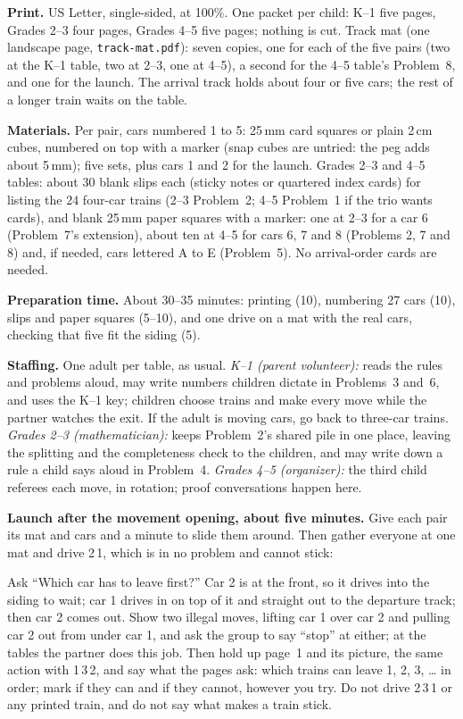 \documentclass[11pt]{article}
\newcommand{\yes}{\ding{51}}\newcommand{\no}{\ding{55}}
\newcommand{\tr}[1]{\mbox{#1}}
\begin{document}
\textbf{Print.} US Letter, single-sided, at 100\%. One packet per child: K--1 five pages, Grades 2--3 four pages, Grades 4--5 five pages; nothing is cut. Track mat (one landscape page, \texttt{track-mat.pdf}): seven copies, one for each of the five pairs (two at the K--1 table, two at 2--3, one at 4--5), a second for the 4--5 table's Problem~8, and one for the launch. The arrival track holds about four or five cars; the rest of a longer train waits on the table.

\textbf{Materials.} Per pair, cars numbered 1 to 5: 25\,mm card squares or plain 2\,cm cubes, numbered on top with a marker (snap cubes are untried: the peg adds about 5\,mm); five sets, plus cars 1 and 2 for the launch. Grades 2--3 and 4--5 tables: about 30 blank slips each (sticky notes or quartered index cards) for listing the 24 four-car trains (2--3 Problem~2; 4--5 Problem~1 if the trio wants cards), and blank 25\,mm paper squares with a marker: one at 2--3 for a car 6 (Problem~7's extension), about ten at 4--5 for cars 6, 7 and 8 (Problems 2, 7 and 8) and, if needed, cars lettered A to E (Problem~5). No arrival-order cards are needed.

\textbf{Preparation time.} About 30--35 minutes: printing (10), numbering 27 cars (10), slips and paper squares (5--10), and one drive on a mat with the real cars, checking that five fit the siding (5).

\textbf{Staffing.} One adult per table, as usual. \emph{K--1 (parent volunteer):} reads the rules and problems aloud, may write numbers children dictate in Problems~3 and~6, and uses the K--1 key; children choose trains and make every move while the partner watches the exit. If the adult is moving cars, go back to three-car trains. \emph{Grades 2--3 (mathematician):} keeps Problem~2's shared pile in one place, leaving the splitting and the completeness check to the children, and may write down a rule a child says aloud in Problem~4. \emph{Grades 4--5 (organizer):} the third child referees each move, in rotation; proof conversations happen here.

\textbf{Launch after the movement opening, about five minutes.} Give each pair its mat and cars and a minute to slide them around. Then gather everyone at one mat and drive \tr{2\,1}, which is in no problem and cannot stick:
\begin{center}

\end{center}
Ask ``Which car has to leave first?'' Car 2 is at the front, so it drives into the siding to wait; car 1 drives in on top of it and straight out to the departure track; then car 2 comes out. Show two illegal moves, lifting car 1 over car 2 and pulling car 2 out from under car 1, and ask the group to say ``stop'' at either; at the tables the partner does this job. Then hold up page~1 and its picture, the same action with \tr{1\,3\,2}, and say what the pages ask: which trains can leave 1, 2, 3, \dots{} in order; mark \yes{} if they can and \no{} if they cannot, however you try. Do not drive \tr{2\,3\,1} or any printed train, and do not say what makes a train stick.
\end{document}
